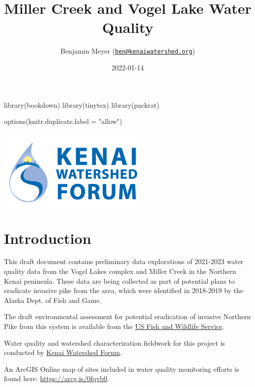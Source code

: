 \documentclass[
]{book}
\title{Miller Creek and Vogel Lake Water Quality}
\author{Benjamin Meyer (\href{mailto:ben@kenaiwatershed.org}{\nolinkurl{ben@kenaiwatershed.org}})}
\date{2022-01-14}
\newenvironment{Shaded}{\begin{snugshade}}{\end{snugshade}}
\newcommand{\AttributeTok}[1]{\textcolor[rgb]{0.77,0.63,0.00}{#1}}
\newcommand{\FunctionTok}[1]{\textcolor[rgb]{0.00,0.00,0.00}{#1}}
\newcommand{\NormalTok}[1]{#1}
\newcommand{\StringTok}[1]{\textcolor[rgb]{0.31,0.60,0.02}{#1}}
\begin{document}
\maketitle

{
\setcounter{tocdepth}{1}
\tableofcontents
}
\begin{Shaded}
\begin{Highlighting}[]
\FunctionTok{library}\NormalTok{(bookdown)}
\FunctionTok{library}\NormalTok{(tinytex)}
\FunctionTok{library}\NormalTok{(packrat)}

\FunctionTok{options}\NormalTok{(}\AttributeTok{knitr.duplicate.label =} \StringTok{"allow"}\NormalTok{)}
\end{Highlighting}
\end{Shaded}

\includegraphics{images/KWF_logo.png}

\hypertarget{introduction}{%
\chapter{Introduction}\label{introduction}}

This draft document contains preliminary data explorations of 2021-2023 water quality data from the Vogel Lakes complex and Miller Creek in the Northern Kenai peninsula. These data are being collected as part of potential plans to eradicate invasive pike from the area, which were identified in 2018-2019 by the Alaska Dept. of Fish and Game.

The draft environmental assessment for potential eradication of invasive Northern Pike from this system is available from the \href{https://www.fws.gov/uploadedFiles/Region_7/NWRS/Zone_2/Kenai/PDF/Draft\%20EA\%20Northern\%20Pike\%20KNWR.pdf}{US Fish and Wildlife Service}.

Water quality and watershed characterization fieldwork for this project is conducted by \href{https://www.kenaiwatershed.org/}{Kenai Watershed Forum}.

An ArcGIS Online map of sites included in water quality monitoring efforts is found here: \url{https://arcg.is/0fqvb0}.
\end{document}
